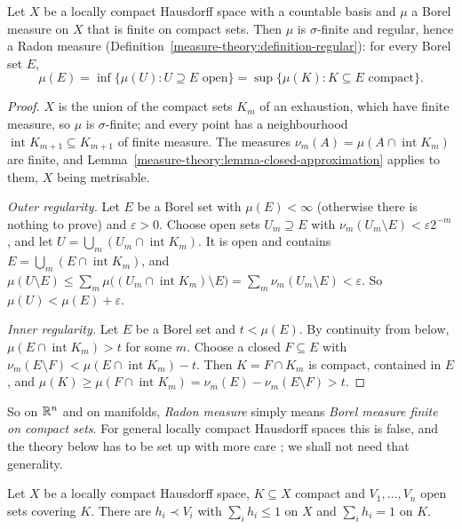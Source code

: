 \begin{proposition}\label{measure-theory:proposition-radon-automatic}
Let $X$ be a locally compact Hausdorff space with a countable basis and $\mu$ a Borel measure on $X$ that is finite on compact sets. Then $\mu$ is $\sigma$-finite and regular, hence a Radon measure
(Definition~\ref{measure-theory:definition-regular}): for every Borel set $E$,
\[
\mu(E) = \inf\{\mu(U) : U \supseteq E \text{ open}\} = \sup\{\mu(K) : K \subseteq E \text{ compact}\}.
\]
\end{proposition}

\begin{proof}
$X$ is the union of the compact sets $K_m$ of an exhaustion, which have finite measure, so $\mu$ is $\sigma$-finite; and every point has a neighbourhood $\operatorname{int}K_{m+1} \subseteq K_{m+1}$ of finite
measure. The measures $\nu_m(A) = \mu(A \cap \operatorname{int}K_m)$ are finite, and Lemma~\ref{measure-theory:lemma-closed-approximation} applies to them, $X$ being metrisable.

\emph{Outer regularity.} Let $E$ be a Borel set with $\mu(E) < \infty$ (otherwise there is nothing to prove) and $\varepsilon > 0$. Choose open sets $U_m \supseteq E$ with
$\nu_m(U_m \setminus E) < \varepsilon2^{-m}$, and let $U = \bigcup_m(U_m \cap \operatorname{int}K_m)$. It is open and contains $E = \bigcup_m(E \cap \operatorname{int}K_m)$, and
$\mu(U \setminus E) \leq \sum_m\mu\bigl((U_m \cap \operatorname{int}K_m) \setminus E\bigr) = \sum_m\nu_m(U_m \setminus E) < \varepsilon$. So $\mu(U) < \mu(E) + \varepsilon$.

\emph{Inner regularity.} Let $E$ be a Borel set and $t < \mu(E)$. By continuity from below, $\mu(E \cap \operatorname{int}K_m) > t$ for some $m$. Choose a closed $F \subseteq E$ with
$\nu_m(E \setminus F) < \mu(E \cap \operatorname{int}K_m) - t$. Then $K = F \cap K_m$ is compact, contained in $E$, and
$\mu(K) \geq \mu(F \cap \operatorname{int}K_m) = \nu_m(E) - \nu_m(E \setminus F) > t$.
\end{proof}

So on $\mathbb{R}^n$ and on manifolds, \emph{Radon measure} simply means \emph{Borel measure finite on compact sets}. For general locally compact Hausdorff spaces this is false, and the theory below has to
be set up with more care \cite[Chapter 2]{rudin-rca}; we shall not need that generality.

\begin{lemma}\label{measure-theory:lemma-partition-compact}
Let $X$ be a locally compact Hausdorff space, $K \subseteq X$ compact and $V_1, \ldots, V_n$ open sets covering $K$. There are $h_i \prec V_i$ with $\sum_ih_i \leq 1$ on $X$ and $\sum_ih_i = 1$ on $K$.
\end{lemma}

